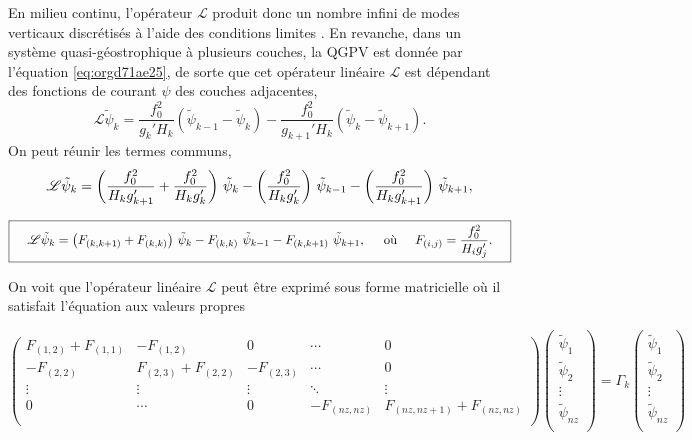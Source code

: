 \documentclass[10pt]{article}
\numberwithin{equation}{section}
\newcommand{\tpsi}{\tilde{\psi}}
\begin{document}
En milieu continu, l'opérateur \(\mathscr{L}\) produit donc un nombre infini de modes verticaux discrétisés à l'aide des conditions limites \autocite[p.468]{vallis_2006}.
En revanche, dans un système quasi-géostrophique à plusieurs couches, la QGPV est donnée par l'équation \ref{eq:orgd71ae25}, de sorte que cet opérateur linéaire \(\mathscr{L}\) est dépendant des fonctions de courant \(\psi\) des couches adjacentes,
\begin{equation}
\mathscr{L}\tpsi_k = \frac{f_0^2}{g_k' H_k} (\tpsi_{k-1} - \tpsi_k) - \frac{f_0^2}{g_{k+1}'H_k} (\tpsi_k - \tpsi_{k+1}).
\end{equation}
On peut réunir les termes communs,
\begin{align}
\mathscr{L} \tpsi_k = \qty( \frac{f_0^2}{H_k g'_{k+1}} + \frac{f_0^2}{H_k g'_{k}} )\ \tpsi_k
- \qty(\frac{f_0^2}{H_k g'_{k}})\ \tpsi_{k-1}
- \qty(\frac{f_0^2}{H_k g'_{k+1}})\ \tpsi_{k+1},\nonumber
\end{align}

\begin{equation}
\boxed{\hspace{0.4cm}
\mathscr{L}\tpsi_k = \qty( F_{(k,k+1)} + F_{(k,k)}) \ \tpsi_k
- F_{(k,k)}\ \tpsi_{k-1}
- F_{(k,k+1)}\ \tpsi_{k+1},
\hspace{0.5cm}\text{où}\hspace{0.5cm}
F_{(i,j)} = \frac{f_0^2}{H_i g'_j}.
\hspace{0.4cm} }
\end{equation}

On voit que l'opérateur linéaire \(\mathscr{L}\) peut être exprimé sous forme matricielle où il satisfait l'équation aux valeurs propres

\[
\begin{pmatrix}
 F_{(1,2)} + F_{(1,1)} & -F_{(1,2)} & 0 & \cdots & 0 \\
 -F_{(2,2)} & F_{(2,3)} + F_{(2,2)} & -F_{(2,3)} & \cdots & 0 \\
 \vdots & \vdots & \vdots & \ddots & \vdots \\
 0 & \cdots & 0 & -F_{(nz,nz)} & F_{(nz,nz+1)} + F_{(nz,nz)} \\
\end{pmatrix}
\begin{pmatrix}
 \tpsi_1 \\
 \tpsi_2 \\
 \vdots \\
 \tpsi_{nz} \\
\end{pmatrix}
=\Gamma_k\begin{pmatrix}
 \tpsi_1 \\
 \tpsi_2 \\
 \vdots \\
 \tpsi_{nz} \\
\end{pmatrix}
\]
\end{document}
